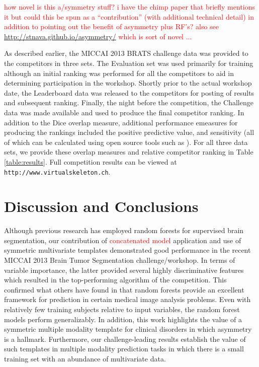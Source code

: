 \documentclass[final,5p,times,twocolumn]{elsarticle}
\begin{document}
\textcolor{red}{how novel is this a/symmetry stuff?  i have the chimp
  paper that briefly mentions it but could this be spun as a
  ``contribution'' (with additional technical detail) in addition to pointing out the benefit of asymmetry
  plus RF's?  also see
  \href{http://stnava.github.io/asymmetry/}{http://stnava.github.io/asymmetry/}
  which is sort of novel ... }

As described earlier, the MICCAI 2013 BRATS challenge data was provided to the
competitors in three sets.  The Evaluation set was used primarily for training
although an initial ranking was performed for all the competitors to aid in
determining participation in the workshop.  Shortly prior to the actual workshop
date, the Leaderboard data was released to the competitors for posting of results
and subsequent ranking.  Finally, the night before the competition, the Challenge
data was made available and used to produce the final competitor ranking.  In addition
to the Dice overlap measure, additional performance emeasures for producing the rankings 
included the positive predictive value, and sensitivity (all of which can be calculated
using open source tools such as \cite{tustison2009}).  
For all three data sets, we provide these overlap measures and relative competitor 
ranking in Table \ref{table:results}.  Full competition results can be viewed
at {\tt http://www.virtualskeleton.ch}.

\section{Discussion and Conclusions} 

Although previous research has employed random forests for supervised brain
segmentation, our contribution of \textcolor{red}{concatenated model} application and use
of symmetric multivariate templates demonstrated good performance 
in the recent MICCAI 2013 Brain Tumor Segmentation challenge/workshop.  
In terms of variable importance, the latter provided several highly 
discriminative features which resulted in the top-performing algorithm 
of the competition.  This confirmed what others have found in that
random forests provide an excellent framework for prediction in certain
medical image analysis problems.  Even with relatively few training
subjects relative to input variables, the random forest models
perform generalizably.
In addition, this work highlights the value of  a symmetric multiple
modality template for clinical disorders in which asymmetry is a
hallmark.  Furthermore, our challenge-leading results establish the
value of such templates in multiple modality prediction
tasks in which there is a small training set with an abundance of
multivariate data.
\end{document}
